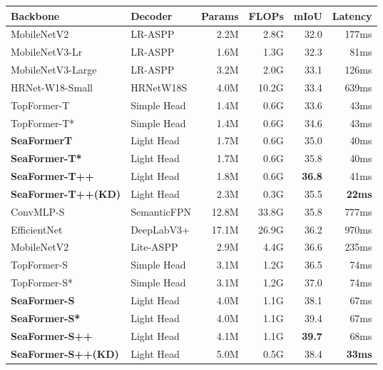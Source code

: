\begin{table*}
\small
\centering

\begin{tabular}{L{3.6cm} L{1.9cm}| r |r| r |r}
\hline

\hline

\hline
Backbone  & Decoder & Params  &FLOPs & mIoU & Latency\\
\hline

\hline
\hline
MobileNetV2 &  LR-ASPP &  2.2M & 2.8G & 32.0 & 177ms \\
MobileNetV3-Lr &  LR-ASPP &  1.6M & 1.3G & 32.3 & 81ms \\
MobileNetV3-Large &  LR-ASPP &  3.2M & 2.0G & 33.1 & 126ms \\
HRNet-W18-Small  &  HRNetW18S  &  4.0M  & 10.2G  & 33.4  & 639ms \\
TopFormer-T &  Simple Head &  1.4M  & 0.6G  & 33.6  & 43ms   \\
TopFormer-T* &  Simple Head &  1.4M  & 0.6G  & 34.6  & 43ms   \\
\textbf{SeaFormerT}  &  Light Head &  1.7M    & 0.6G   & 35.0      & 40ms\\
\textbf{SeaFormer-T*}  &  Light Head &  1.7M    & 0.6G  & 35.8 & 40ms\\
\textbf{SeaFormer-T++}  &  Light Head &  1.8M    & 0.6G  & \textbf{36.8} & 41ms\\
\textbf{SeaFormer-T++(KD)}  &  Light Head &  2.3M    & 0.3G  & 35.5 & \textbf{22ms}\\
\hline

\hline
\hline
ConvMLP-S &  SemanticFPN &  12.8M & 33.8G & 35.8 & 777ms \\
EfficientNet &  DeepLabV3+  &17.1M & 26.9G & 36.2 & 970ms \\
MobileNetV2 &  Lite-ASPP  & 2.9M & 4.4G & 36.6 & 235ms \\
TopFormer-S  &  Simple Head &  3.1M   & 1.2G   & 36.5  & 74ms   \\
TopFormer-S*  &  Simple Head &  3.1M   & 1.2G   & 37.0  & 74ms   \\
\textbf{SeaFormer-S}  &  Light Head &  4.0M     & 1.1G   & 38.1   & 67ms\\
\textbf{SeaFormer-S*}  &  Light Head &  4.0M    & 1.1G    & 39.4  & 67ms\\
\textbf{SeaFormer-S++}  &  Light Head &  4.1M    & 1.1G    & \textbf{39.7}  & 68ms\\
\textbf{SeaFormer-S++(KD)}  &  Light Head &  5.0M    & 0.5G  & 38.4 & \textbf{33ms}\\
\hline


\end{tabular}
\end{table*}
